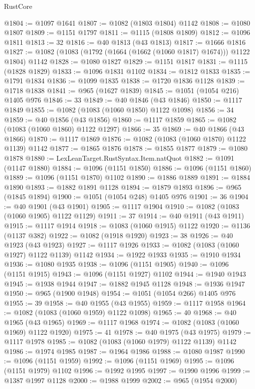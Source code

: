 \begin{lexlean}{RustCore}
\begin{coremodule}
@1804 := @1097 @1641
@1807 := @1082 (@1803 @1804) @1142
@1808 := @1080 @1807
@1809 := @1151 @1797
@1811 := @1115 (@1808 @1809)
@1812 := @1096 @1811
@1813 := 32
@1816 := @40 @1813 (@43 @1813)
@1817 := @1666 @1816
@1827 := @1082 (@1083 (@1792 (@1664 (@1662 (@1060 @1817) @1674))) @1122 @1804) @1142
@1828 := @1080 @1827
@1829 := @1151 @1817
@1831 := @1115 (@1828 @1829)
@1833 := @1096 @1831 @1102
@1834 := @1812 @1833
@1835 := @1791 @1834
@1836 := @1099 @1835
@1838 := @1720 @1836 @1128
@1839 := @1718 @1838
@1841 := @965 (@1627 @1839)
@1845 := @1051 (@1054 @216) @1405 @976
@1846 := 33
@1849 := @40 @1846 (@43 @1846)
@1850 := @1117 @1849
@1855 := @1082 (@1083 (@1060 @1850) @1122 @1098)
@1856 := 34
@1859 := @40 @1856 (@43 @1856)
@1860 := @1117 @1859
@1865 := @1082 (@1083 (@1060 @1860) @1122 @1297)
@1866 := 35
@1869 := @40 @1866 (@43 @1866)
@1870 := @1117 @1869
@1876 := @1082 (@1083 (@1060 @1870) @1122 @1139) @1142
@1877 := @1865 @1876
@1878 := @1855 @1877
@1879 := @1080 @1878
@1880 := LexLeanTarget.RustSyntax.Item.natQuot
@1882 := @1091 (@1147 @1880)
@1884 := @1096 (@1151 @1850)
@1886 := @1096 (@1151 @1860)
@1889 := @1096 (@1151 @1870) @1102
@1890 := @1886 @1889
@1891 := @1884 @1890
@1893 := @1882 @1891 @1128
@1894 := @1879 @1893
@1896 := @965 (@1845 @1894)
@1900 := @1051 (@1054 @248) @1405 @976
@1901 := 36
@1904 := @40 @1901 (@43 @1901)
@1905 := @1117 @1904
@1910 := @1082 (@1083 (@1060 @1905) @1122 @1129)
@1911 := 37
@1914 := @40 @1911 (@43 @1911)
@1915 := @1117 @1914
@1918 := @1083 (@1060 @1915) @1122
@1920 := @1136 (@1137 @382)
@1922 := @1082 (@1918 @1920)
@1923 := 38
@1926 := @40 @1923 (@43 @1923)
@1927 := @1117 @1926
@1933 := @1082 (@1083 (@1060 @1927) @1122 @1139) @1142
@1934 := @1922 @1933
@1935 := @1910 @1934
@1936 := @1080 @1935
@1938 := @1096 (@1151 @1905)
@1940 := @1096 (@1151 @1915)
@1943 := @1096 (@1151 @1927) @1102
@1944 := @1940 @1943
@1945 := @1938 @1944
@1947 := @1882 @1945 @1128
@1948 := @1936 @1947
@1950 := @965 (@1900 @1948)
@1954 := @1051 (@1054 @266) @1405 @976
@1955 := 39
@1958 := @40 @1955 (@43 @1955)
@1959 := @1117 @1958
@1964 := @1082 (@1083 (@1060 @1959) @1122 @1098)
@1965 := 40
@1968 := @40 @1965 (@43 @1965)
@1969 := @1117 @1968
@1974 := @1082 (@1083 (@1060 @1969) @1122 @1920)
@1975 := 41
@1978 := @40 @1975 (@43 @1975)
@1979 := @1117 @1978
@1985 := @1082 (@1083 (@1060 @1979) @1122 @1139) @1142
@1986 := @1974 @1985
@1987 := @1964 @1986
@1988 := @1080 @1987
@1990 := @1096 (@1151 @1959)
@1992 := @1096 (@1151 @1969)
@1995 := @1096 (@1151 @1979) @1102
@1996 := @1992 @1995
@1997 := @1990 @1996
@1999 := @1387 @1997 @1128
@2000 := @1988 @1999
@2002 := @965 (@1954 @2000)

\end{coremodule}
\end{lexlean}
